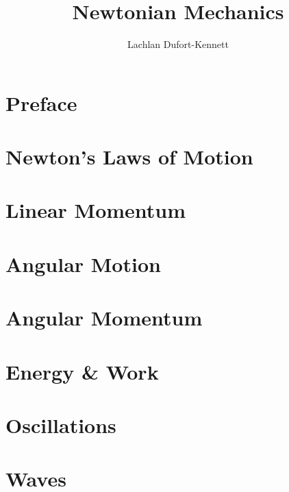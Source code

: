 \documentclass[12pt]{report}
\title{Newtonian Mechanics}
\author{Lachlan Dufort-Kennett}
\theoremstyle{theorem}
\theoremstyle{def}
\begin{document}
    \maketitle
    \setcounter{tocdepth}{1}
    \tableofcontents

    \chapter*{Preface}

    \chapter{Newton's Laws of Motion}
    
    \chapter{Linear Momentum}
    
    \chapter{Angular Motion}
    
    \chapter{Angular Momentum}
    
    \chapter{Energy \& Work}
    
    \chapter{Oscillations}
    
    \chapter{Waves}
    

    \nocite{*}
    
    
\end{document}
